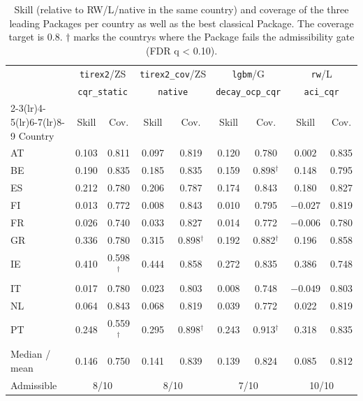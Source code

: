 \begin{table}[t]
\centering\small
\caption{Skill (relative to  RW/L/native in the same country) and coverage of the three leading Packages per country as well as the best classical Package. The coverage target is 0.8. $\dagger$ marks the countrys where the Package fails the admissibility gate  (FDR q < 0.10).}
\label{tab:res_percountry}
\begin{tabular}{lcccccccc}
\toprule
& \multicolumn{2}{c}{\texttt{tirex2}/ZS} & \multicolumn{2}{c}{\texttt{tirex2\_cov}/ZS} & \multicolumn{2}{c}{\texttt{lgbm}/G} & \multicolumn{2}{c}{\texttt{rw}/L} \\
& \multicolumn{2}{c}{\texttt{cqr\_static}} & \multicolumn{2}{c}{\texttt{native}} & \multicolumn{2}{c}{\texttt{decay\_ocp\_cqr}} & \multicolumn{2}{c}{\texttt{aci\_cqr}} \\
\cmidrule(lr){2-3}\cmidrule(lr){4-5}\cmidrule(lr){6-7}\cmidrule(lr){8-9}
Country & Skill & Cov. & Skill & Cov. & Skill & Cov. & Skill & Cov. \\
\midrule
AT & 0.103 & 0.811 & 0.097 & 0.819 & 0.120 & 0.780 & $0.002$ & 0.835 \\
BE & 0.190 & 0.835 & 0.185 & 0.835 & 0.159 & 0.898$^\dagger$ & 0.148 & 0.795 \\
ES & 0.212 & 0.780 & 0.206 & 0.787 & 0.174 & 0.843 & 0.180 & 0.827 \\
FI & 0.013 & 0.772 & 0.008 & 0.843 & 0.010 & 0.795 & $-0.027$ & 0.819 \\
FR & 0.026 & 0.740 & 0.033 & 0.827 & 0.014 & 0.772 & $-0.006$ & 0.780 \\
GR & 0.336 & 0.780 & 0.315 & 0.898$^\dagger$ & 0.192 & 0.882$^\dagger$ & 0.196 & 0.858 \\
IE & 0.410 & 0.598$^\dagger$ & 0.444 & 0.858 & 0.272 & 0.835 & 0.386 & 0.748 \\
IT & 0.017 & 0.780 & 0.023 & 0.803 & 0.008 & 0.748 & $-0.049$ & 0.803 \\
NL & 0.064 & 0.843 & 0.068 & 0.819 & 0.039 & 0.772 & 0.022 & 0.819 \\
PT & 0.248 & 0.559$^\dagger$ & 0.295 & 0.898$^\dagger$ & 0.243 & 0.913$^\dagger$ & 0.318 & 0.835 \\
\midrule
Median / mean & 0.146 & 0.750 & 0.141 & 0.839 & 0.139 & 0.824 & 0.085 & 0.812 \\
Admissible & \multicolumn{2}{c}{8/10} & \multicolumn{2}{c}{8/10} & \multicolumn{2}{c}{7/10} & \multicolumn{2}{c}{10/10} \\
\bottomrule
\end{tabular}
\end{table}


